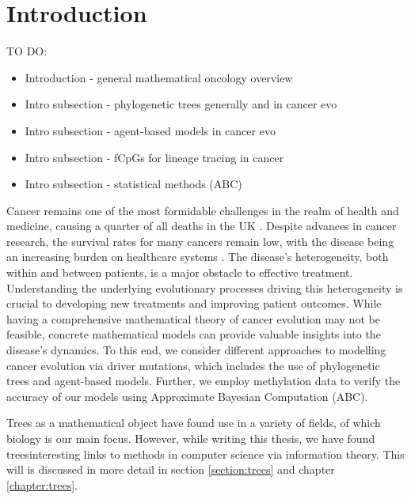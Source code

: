 \chapter{Introduction}\label{chapter:introduction}
TO DO:
\begin{itemize}
    \item Introduction - general mathematical oncology overview
    \item Intro subsection - phylogenetic trees generally and in cancer evo
    \item Intro subsection - agent-based models in cancer evo
    \item Intro subsection - fCpGs for lineage tracing in cancer
    \item Intro subsection - statistical methods (ABC)
\end{itemize}

Cancer remains one of the most formidable challenges in the realm of health and medicine, causing a quarter of all deaths in the UK \cite{cruk_2022}.
Despite advances in cancer research, the survival rates for many cancers remain low, with the disease being an increasing burden on healthcare
systems \cite{financial_burden}. The disease's heterogeneity, both within and between patients, is a major obstacle to effective treatment. Understanding the
underlying evolutionary processes driving this heterogeneity is crucial to developing new treatments and improving patient outcomes.
While having a comprehensive mathematical theory of cancer evolution may not be feasible, concrete mathematical models can provide valuable insights into the
disease's dynamics. To this end, we consider different approaches to modelling cancer evolution via driver mutations, which includes the use of phylogenetic
trees and agent-based models. Further, we employ methylation data to verify the accuracy of our models using Approximate Bayesian Computation (ABC).\par
Trees as a mathematical object have found use in a variety of fields, of which biology is our main focus. However, while writing this thesis, we have found
treesinteresting links to methods in computer science via information theory. This will is discussed in more detail in section \ref{section:trees} and chapter
\ref{chapter:trees}.


